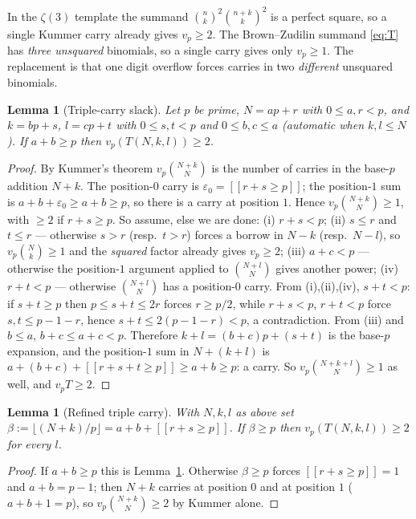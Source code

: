 \documentclass[11pt,reqno]{amsart}
\theoremstyle{plain}
\newtheorem{lemma}[theorem]{Lemma}
\theoremstyle{definition}
\theoremstyle{remark}
\numberwithin{equation}{section}
\newcommand{\ii}[1]{[\![#1]\!]}
\begin{document}
In the $\zeta(3)$ template the summand $\binom nk^2\binom{n+k}{k}^2$ is a perfect square, so a
single Kummer carry already gives $v_p\ge2$. The Brown--Zudilin summand \eqref{eq:T} has
\emph{three unsquared} binomials, so a single carry gives only $v_p\ge1$. The replacement is
that one digit overflow forces carries in two \emph{different} unsquared binomials.

\begin{lemma}[Triple-carry slack]\label{lem:D}
Let $p$ be prime, $N=ap+r$ with $0\le a,r<p$, and $k=bp+s$, $l=cp+t$ with $0\le s,t<p$ and
$0\le b,c\le a$ \textup{(}automatic when $k,l\le N$\textup{)}. If $a+b\ge p$ then
$v_p(T(N,k,l))\ge2$.
\end{lemma}

\begin{proof}
By Kummer's theorem $v_p\binom{N+k}{N}$ is the number of carries in the base-$p$ addition
$N+k$. The position-$0$ carry is $\varepsilon_0=\ii{r+s\ge p}$; the position-$1$ sum is
$a+b+\varepsilon_0\ge a+b\ge p$, so there is a carry at position $1$. Hence
$v_p\binom{N+k}{N}\ge1$, with $\ge2$ if $r+s\ge p$. So assume, else we are done:
(i) $r+s<p$; (ii) $s\le r$ and $t\le r$ --- otherwise $s>r$ (resp.\ $t>r$) forces a borrow in
$N-k$ (resp.\ $N-l$), so $v_p\binom{N}{k}\ge1$ and the \emph{squared} factor already gives
$v_p\ge2$; (iii) $a+c<p$ --- otherwise the position-$1$ argument applied to $\binom{N+l}{N}$
gives another power; (iv) $r+t<p$ --- otherwise $\binom{N+l}{N}$ has a position-$0$ carry.
From (i),(ii),(iv), $s+t<p$: if $s+t\ge p$ then $p\le s+t\le 2r$ forces $r\ge p/2$, while
$r+s<p$, $r+t<p$ force $s,t\le p-1-r$, hence $s+t\le2(p-1-r)<p$, a contradiction. From (iii)
and $b\le a$, $b+c\le a+c<p$. Therefore $k+l=(b+c)p+(s+t)$ is the base-$p$ expansion, and the
position-$1$ sum in $N+(k+l)$ is $a+(b+c)+\ii{r+s+t\ge p}\ge a+b\ge p$: a carry. So
$v_p\binom{N+k+l}{N}\ge1$ as well, and $v_pT\ge2$.
\end{proof}

\begin{lemma}[Refined triple carry]\label{lem:Dplus}
With $N,k,l$ as above set $\beta:=\lfloor(N+k)/p\rfloor=a+b+\ii{r+s\ge p}$. If $\beta\ge p$
then $v_p(T(N,k,l))\ge2$ for every $l$.
\end{lemma}

\begin{proof}
If $a+b\ge p$ this is Lemma~\ref{lem:D}. Otherwise $\beta\ge p$ forces $\ii{r+s\ge p}=1$ and
$a+b=p-1$; then $N+k$ carries at position $0$ and at position $1$ ($a+b+1=p$), so
$v_p\binom{N+k}{N}\ge2$ by Kummer alone.
\end{proof}
\end{document}
